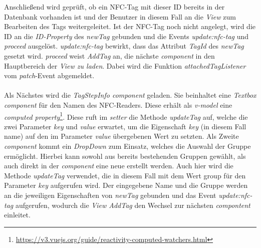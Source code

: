 \documentclass[10pt, a4paper]{article}
\begin{document}
\begin{onehalfspace}
Anschließend wird geprüft, ob ein NFC-Tag mit dieser ID bereits in der Datenbank vorhanden ist und der Benutzer in diesem Fall an die \textit{View} zum Bearbeiten des Tags weitergeleitet.
Ist der NFC-Tag noch nicht angelegt, wird die ID an die \textit{ID-Property} des \textit{newTag} gebunden und die Events \textit{update:nfc-tag} und \textit{proceed} ausgelöst.
\textit{update:nfc-tag} bewirkt, dass das Attribut \textit{TagId} des \textit{newTag} gesetzt wird.
\textit{proceed} weist \textit{AddTag} an, die nächste \textit{component} in den Hauptbereich der \textit{View zu laden}.
Dabei wird die Funktion \textit{attachedTagListener} vom \textit{patch}-Event abgemeldet.
\\~\\
Als Nächstes wird die \textit{TagStepInfo component} geladen.
Sie beinhaltet eine \textit{Textbox component} für den Namen des NFC-Readers.
Diese erhält als \textit{v-model} eine \textit{computed property}\footnote{\url{https://v3.vuejs.org/guide/reactivity-computed-watchers.html}}.
Diese ruft im \textit{setter} die Methode \textit{updateTag} auf, welche die zwei Parameter \textit{key} und \textit{value} erwartet, um die Eigenschaft \textit{key} (in diesem Fall \glqq name\grqq{}) auf den im Parameter \textit{value} übergebenen Wert zu setzten.
Als Zweite \textit{component} kommt ein \textit{DropDown} zum Einsatz,
welches die Auswahl der Gruppe ermöglicht. Hierbei kann sowohl aus bereits bestehenden Gruppen gewählt, als auch direkt in der \textit{component} eine neue erstellt
werden. Auch hier wird die Methode \textit{updateTag} verwendet, die in diesem Fall mit dem Wert \glqq group \grqq{} für den Parameter \textit{key} aufgerufen wird. Der eingegebene Name und die Gruppe werden an die jeweiligen Eigenschaften von \textit{newTag} gebunden und das Event \textit{update:nfc-tag} aufgerufen, wodurch die \textit{View AddTag} den Wechsel zur nächsten \textit{compontent} einleitet.

\end{onehalfspace}
\end{document}
